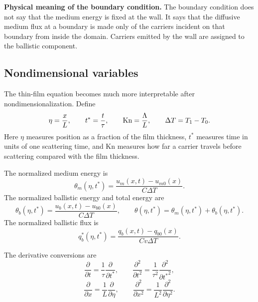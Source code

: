 \documentclass[11pt]{article}
\begin{document}
\begin{physicsbox}
\textbf{Physical meaning of the boundary condition.} The boundary condition does not say that the medium energy is fixed at the wall. It says that the diffusive medium flux at a boundary is made only of the carriers incident on that boundary from inside the domain. Carriers emitted by the wall are assigned to the ballistic component.
\end{physicsbox}

\subsection{Nondimensional variables}
The thin-film equation becomes much more interpretable after nondimensionalization. Define
\begin{equation}
    \eta=\frac{x}{L},
    \qquad
    t^*=\frac{t}{\tau},
    \qquad
    \mathrm{Kn}=\frac{\Lambda}{L},
    \qquad
    \Delta T=T_1-T_0.
\end{equation}
Here \(\eta\) measures position as a fraction of the film thickness, \(t^*\) measures time in units of one scattering time, and \(\mathrm{Kn}\) measures how far a carrier travels before scattering compared with the film thickness.

The normalized medium energy is
\begin{equation}
    \theta_m(\eta,t^*)=\frac{u_m(x,t)-u_{m0}(x)}{C\Delta T}.
    \label{eq:theta_m_def_expanded}
\end{equation}
The normalized ballistic energy and total energy are
\begin{equation}
    \theta_b(\eta,t^*)=\frac{u_b(x,t)-u_{b0}(x)}{C\Delta T},
    \qquad
    \theta(\eta,t^*)=\theta_m(\eta,t^*)+\theta_b(\eta,t^*).
\end{equation}
The normalized ballistic flux is
\begin{equation}
    q_b^*(\eta,t^*)=\frac{q_b(x,t)-q_{b0}(x)}{C v\Delta T}.
    \label{eq:qb_star_def_expanded}
\end{equation}

The derivative conversions are
\begin{equation}
    \frac{\partial}{\partial t}=\frac{1}{\tau}\frac{\partial}{\partial t^*},
    \qquad
    \frac{\partial^2}{\partial t^2}=\frac{1}{\tau^2}\frac{\partial^2}{\partial {t^*}^2},
\end{equation}
\begin{equation}
    \frac{\partial}{\partial x}=\frac{1}{L}\frac{\partial}{\partial\eta},
    \qquad
    \frac{\partial^2}{\partial x^2}=\frac{1}{L^2}\frac{\partial^2}{\partial\eta^2}.
\end{equation}
\end{document}
